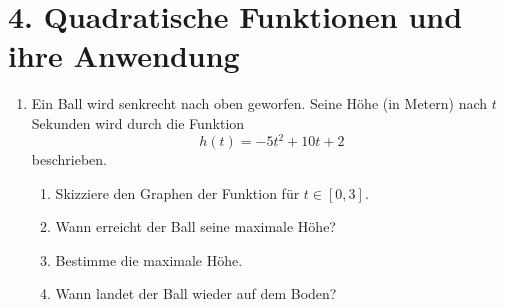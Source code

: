 \section*{4. Quadratische Funktionen und ihre Anwendung}
\begin{enumerate}
    \item Ein Ball wird senkrecht nach oben geworfen. Seine Höhe (in Metern) nach \( t \) Sekunden wird durch die Funktion  
    \[
    h(t) = -5t^2 + 10t + 2
    \]
    beschrieben.
    \begin{enumerate}
        \item Skizziere den Graphen der Funktion für \( t \in [0,3] \).
        \item Wann erreicht der Ball seine maximale Höhe?  
        \item Bestimme die maximale Höhe.
        \item Wann landet der Ball wieder auf dem Boden?
    \end{enumerate}
\end{enumerate}
